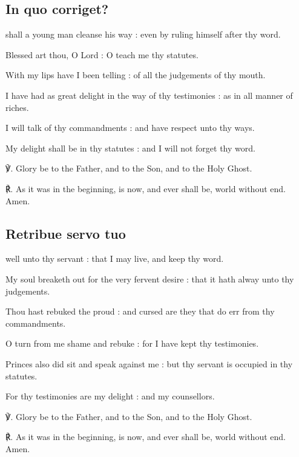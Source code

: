 \begin{multicols}{2}
\subsection{In quo corriget?}
 shall a young man cleanse his way : even by ruling himself after thy word.\par
{}
Blessed art thou, O Lord : O teach me thy statutes.\par
{}With my lips have I been telling : of all the judgements of thy mouth.\par
{}I have had as great delight in the way of thy testimonies : as in all manner of riches.\par
{}I will talk of thy commandments : and have respect unto thy ways.\par
{}My delight shall be in thy statutes : and I will not forget thy word.\par
℣. Glory be to the Father, and to the Son, and to the Holy Ghost.\par
℟. As it was in the beginning, is now, and ever shall be, world without end. Amen.

\subsection{Retribue servo tuo}
 well unto thy servant : that I may live, and keep thy word.\par
{}
My soul breaketh out for the very fervent desire : that it hath alway unto thy judgements.\par
{}Thou hast rebuked the proud : and cursed are they that do err from thy commandments.\par
{}O turn from me shame and rebuke : for I have kept thy testimonies.\par
{}Princes also did sit and speak against me : but thy servant is occupied in thy statutes.\par
{}For thy testimonies are my delight : and my counsellors.\par
℣. Glory be to the Father, and to the Son, and to the Holy Ghost.\par
℟. As it was in the beginning, is now, and ever shall be, world without end. Amen.


\end{multicols}
